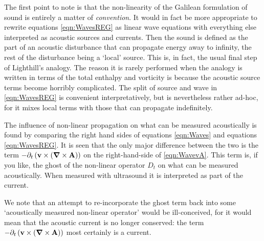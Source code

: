 \documentclass[10pt, fleqn,final,showtrims,oldfontcommands]{article} %
\newcommand{\eqnref}[1]{\ref{eqn:#1}}
\newcommand{\lr}[1]{\left( #1 \right)}
\renewcommand{\d}{\partial}
\newcommand{\del}{\nabla}
\newcommand{\vdel}{ \mbox{\boldmath $\del$}}
\newcommand{\dt}{{\d_t}}
\newcommand{\Dt}{D_t}
\newcommand{\vA}{\textbf{A}}
\newcommand{\vv}{\textbf{v}}
\begin{document}
The first point to note is that the non-linearity of the Galilean formulation of sound is entirely a matter of {\em  convention}.
It would in fact be more appropriate to rewrite equations \eqnref{WavesREG} as linear wave equations with everything else interpreted as acoustic sources and currents.
Then the sound is defined as the part of an acoustic disturbance that can propagate energy away to infinity,
the rest of the disturbance being a `local' source.
This is, in fact, the usual final step of Lighthill's analogy.
The reason it is rarely performed when the analogy is written in terms of the total enthalpy and vorticity is because
the acoustic source terms become horribly complicated.
The split of source and wave in \eqnref{WavesREG} is convenient  interpretatively, but is nevertheless rather ad-hoc,
for it mixes local terms with those that can propagate indefinitely.

The influence of non-linear propagation on what can be measured acoustically is found by comparing the right hand sides of equations \eqnref{Waves} and equations \eqnref{WavesREG}.
It is seen that the only major difference between the two is the term $- \dt \lr{ \vv \times \lr{\vdel \times \vA}}$ on the right-hand-side of \eqnref{WavevA}.
This term is, if you like, the ghost of the non-linear operator $\Dt$ on what can be measured acoustically.
When measured with ultrasound it is interpreted  as part of the current.

We note that an attempt to re-incorporate the ghost  term back into some `acoustically measured non-linear operator' would be ill-conceived, 
for it would mean that the acoustic current is no longer conserved:
the term $- \dt \lr{ \vv \times \lr{\vdel \times \vA}}$ most certainly is a current.






\end{document}
